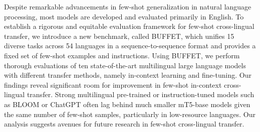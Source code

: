 Despite remarkable advancements in few-shot generalization in natural language processing, most models are developed and evaluated primarily in English. To establish a rigorous and equitable evaluation framework for few-shot cross-lingual transfer, we introduce a new benchmark, called BUFFET, which unifies 15 diverse tasks across 54 languages in a sequence-to-sequence format and provides a fixed set of few-shot examples and instructions.  Using BUFFET, we perform thorough evaluations of ten state-of-the-art multilingual large language models with different transfer methods, namely in-context learning and fine-tuning. Our findings reveal significant room for improvement in few-shot in-context cross-lingual transfer. Strong multilingual pre-trained or instruction-tuned models such as BLOOM or ChatGPT often lag behind much smaller mT5-base models given the same number of few-shot samples, particularly in low-resource languages.  Our analysis suggests avenues for future research in few-shot cross-lingual transfer.